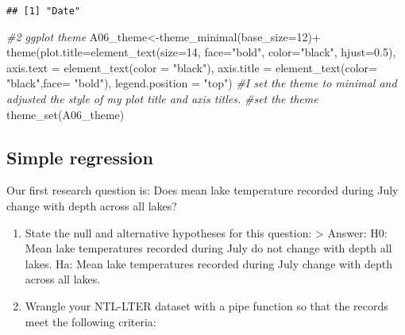 \documentclass[
]{article}
\newenvironment{Shaded}{\begin{snugshade}}{\end{snugshade}}
\newcommand{\AttributeTok}[1]{\textcolor[rgb]{0.77,0.63,0.00}{#1}}
\newcommand{\CommentTok}[1]{\textcolor[rgb]{0.56,0.35,0.01}{\textit{#1}}}
\newcommand{\DecValTok}[1]{\textcolor[rgb]{0.00,0.00,0.81}{#1}}
\newcommand{\FloatTok}[1]{\textcolor[rgb]{0.00,0.00,0.81}{#1}}
\newcommand{\FunctionTok}[1]{\textcolor[rgb]{0.00,0.00,0.00}{#1}}
\newcommand{\NormalTok}[1]{#1}
\newcommand{\OtherTok}[1]{\textcolor[rgb]{0.56,0.35,0.01}{#1}}
\newcommand{\SpecialCharTok}[1]{\textcolor[rgb]{0.00,0.00,0.00}{#1}}
\newcommand{\StringTok}[1]{\textcolor[rgb]{0.31,0.60,0.02}{#1}}
\begin{document}
\begin{verbatim}
## [1] "Date"
\end{verbatim}

\begin{Shaded}
\begin{Highlighting}[]
\CommentTok{\#2 ggplot theme }
\NormalTok{A06\_theme}\OtherTok{\textless{}{-}}\FunctionTok{theme\_minimal}\NormalTok{(}\AttributeTok{base\_size=}\DecValTok{12}\NormalTok{)}\SpecialCharTok{+}
           \FunctionTok{theme}\NormalTok{(}\AttributeTok{plot.title=}\FunctionTok{element\_text}\NormalTok{(}\AttributeTok{size=}\DecValTok{14}\NormalTok{, }
                                    \AttributeTok{face=}\StringTok{"bold"}\NormalTok{, }
                                    \AttributeTok{color=}\StringTok{"black"}\NormalTok{,}
                                    \AttributeTok{hjust=}\FloatTok{0.5}\NormalTok{),}
                 \AttributeTok{axis.text =} \FunctionTok{element\_text}\NormalTok{(}\AttributeTok{color =} \StringTok{"black"}\NormalTok{),}
                 \AttributeTok{axis.title =} \FunctionTok{element\_text}\NormalTok{(}\AttributeTok{color=} \StringTok{"black"}\NormalTok{,}\AttributeTok{face=} \StringTok{"bold"}\NormalTok{),}
                 \AttributeTok{legend.position =} \StringTok{"top"}\NormalTok{)}
\CommentTok{\#I set the theme to minimal and adjusted the style of my plot title and axis titles.}
\CommentTok{\#set the theme}
\FunctionTok{theme\_set}\NormalTok{(A06\_theme)}
\end{Highlighting}
\end{Shaded}

\hypertarget{simple-regression}{%
\subsection{Simple regression}\label{simple-regression}}

Our first research question is: Does mean lake temperature recorded
during July change with depth across all lakes?

\begin{enumerate}
\def\labelenumi{\arabic{enumi}.}
\setcounter{enumi}{2}
\item
  State the null and alternative hypotheses for this question:
  \textgreater{} Answer: H0: Mean lake temperatures recorded during July
  do not change with depth all lakes. Ha: Mean lake temperatures
  recorded during July change with depth across all lakes.
\item
  Wrangle your NTL-LTER dataset with a pipe function so that the records
  meet the following criteria:
\end{enumerate}
\end{document}
